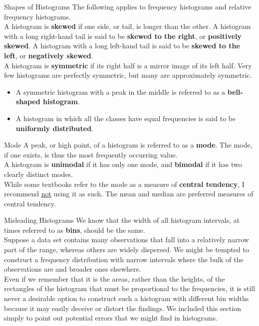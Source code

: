 \documentclass[pdf]{beamer}
\newcommand{\empr}[1]{{\color{franklinblue}\textbf{#1}}}
\theoremstyle{remark}
\theoremstyle{definition}
\begin{document}
\begin{frame}[t]{Shapes of Histograms}
The following applies to frequency histograms and relative frequency histograms. \\
\vspace{1.5ex}
A histogram is \empr{skewed} if one side, or tail, is longer than the other. A histogram with a long right-hand tail is said to be \empr{skewed to the right}, or \empr{positively skewed}. A histogram with a long left-hand tail is said to be \empr{skewed to the left}, or \empr{negatively skewed}. \\
\vspace{1.5ex}
A histogram is \empr{symmetric} if its right half is a mirror image of its left half. Very few histograms are perfectly symmetric, but many are approximately symmetric. \\
\vspace{0ex}
\small 
\begin{itemize}
\item  A symmetric histogram with a peak in the middle is referred to as a \empr{bell-shaped histogram}.
\item A histogram in which all the classes have equal frequencies is said to be \empr{uniformly distributed}.
\end{itemize}
\end{frame}

\begin{frame}[t]{Mode}
A peak, or high point, of a histogram is referred to as a \empr{mode}.  The mode, if one exists, is thus the most frequently occurring value. \\
\vspace{1.5ex}
A histogram is \empr{unimodal} if it has only one mode, and \empr{bimodal} if it has two clearly distinct modes. \\
\vspace{1.5ex}
While some textbooks refer to the mode as a measure of \empr{central tendency}, I recommend \underline{not} using it as such. The mean and median are preferred measures of central tendency.
\end{frame}

\begin{frame}[t]{Misleading Histograms}
We know that the width of all histogram intervals, at times referred to as \empr{bins}, should be the same. \\
\vspace{1.5ex}
Suppose a data set contains many observations that fall into a relatively narrow part of the range, whereas others are widely dispersed. We might be tempted to construct a frequency distribution with narrow intervals where the bulk of the observations are and broader ones elsewhere. \\
\vspace{1.5ex}
Even if we remember that it is the areas, rather than the heights, of the rectangles of the histogram that must be proportional to the frequencies, it is still never a desirable option to construct such a histogram with different bin widths because it may easily deceive or distort the findings. We included this section simply to point out potential errors that we might find in histograms.
\end{frame}
\end{document}
